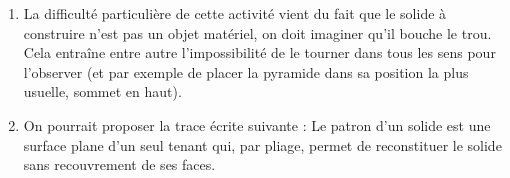 \begin{enumerate}
\begin{enumerate}
   \end{enumerate}
   \item La difficulté particulière de cette activité vient du fait que le solide à construire n’est pas un objet matériel, on doit imaginer qu’il bouche le trou. Cela entraîne entre autre l’impossibilité de le tourner dans tous les sens pour l’observer (et par exemple de placer la pyramide dans sa position la plus usuelle, sommet en haut). \\
   \item On pourrait proposer la trace écrite suivante : \og Le patron d’un solide est une surface plane d’un seul tenant qui, par pliage, permet de reconstituer le solide sans recouvrement de ses faces. \fg{}
\end{enumerate}
